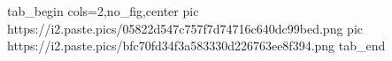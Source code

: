 
 
 
 
 

\ifcmt
  tab_begin cols=2,no_fig,center
     pic https://i2.paste.pics/05822d547c757f7d74716c640dc99bed.png
		 pic https://i2.paste.pics/bfc70fd34f3a583330d226763ee8f394.png
  tab_end
\fi

